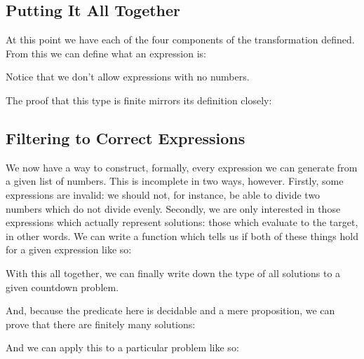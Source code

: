 \subsection{Putting It All Together}
At this point we have each of the four components of the transformation defined.
From this we can define what an expression is:
\begin{agdalisting}
\end{agdalisting}
Notice that we don't allow expressions with no numbers.

The proof that this type is finite mirrors its definition closely:
\begin{agdalisting}
\end{agdalisting}
\subsection{Filtering to Correct Expressions}
We now have a way to construct, formally, every expression we can generate from
a given list of numbers.
This is incomplete in two ways, however.
Firstly, some expressions are invalid: we should not, for instance, be able to
divide two numbers which do not divide evenly.
Secondly, we are only interested in those expressions which actually represent
solutions: those which evaluate to the target, in other words.
We can write a function which tells us if both of these things hold for a given
expression like so:

\begin{minipage}{\linewidth}
  \begin{multicols}{2}
    \begin{agdalisting}
    \end{agdalisting} \columnbreak
    \begin{agdalisting}
    \end{agdalisting}
  \end{multicols}
\end{minipage}

With this all together, we can finally write down the type of all solutions to a
given countdown problem.
\begin{agdalisting}
\end{agdalisting}
And, because the predicate here is decidable and a mere proposition, we can
prove that there are finitely many solutions:
\begin{agdalisting}
\end{agdalisting}
And we can apply this to a particular problem like so:
\begin{agdalisting}
\end{agdalisting}
